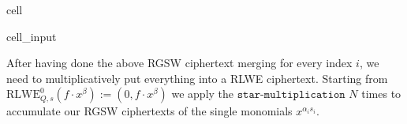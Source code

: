 \documentclass[letterpaper,10pt,english]{jupyterBook}
\begin{document}
\begin{sphinxuseclass}{cell}\begin{sphinxVerbatimInput}

\begin{sphinxuseclass}{cell_input}
\begin{sphinxVerbatim}[commandchars=\\\{\}]
   
      \PYG{p}{[}        \PYG{p}{]}
      
     \PYG{p}{[}\PYG{p}{[}\PYG{p}{[}\PYG{p}{[}\PYG{p}{]} \PYG{p}{]}    \PYG{p}{]} \PYG{p}{[}\PYG{p}{[} \PYG{p}{[}\PYG{p}{]}\PYG{p}{]}    \PYG{p}{]}\PYG{p}{]}
\end{sphinxVerbatim}

\end{sphinxuseclass}\end{sphinxVerbatimInput}

\end{sphinxuseclass}
\sphinxAtStartPar
After having done the above RGSW ciphertext merging for every index \(i\), we need to multiplicatively put everything into a RLWE ciphertext.
Starting from \(\mathrm{RLWE}_{Q,s}^0(f \cdot x^\beta) := (0,f\cdot x^{\beta})\) we apply the \(\texttt{star-multiplication}\) \(N\) times to accumulate our RGSW ciphertexts of the single monomials \(x^{\alpha_i s_i}\).
\end{document}
